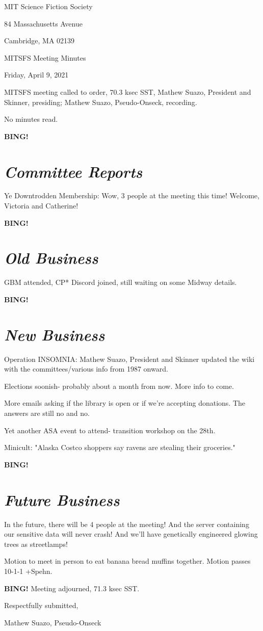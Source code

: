\documentclass[10pt]{article}
\newcommand{\bing}{{\bf BING!} }
\newcommand{\goto}[1]{\bing \vskip 12pt \section*{{\em{#1}}}}
\newcommand{\skinner}{Mathew Suazo, President and Skinner\xspace}
\newcommand{\onseck}{Mathew Suazo, Pseudo-Onseck\xspace}
\newcommand{\meetingdate}{Friday, April 9, 2021}
\begin{document}
\begin{center}

MIT Science Fiction Society

84 Massachusetts Avenue

Cambridge, MA 02139

\vspace{12pt}

MITSFS Meeting Minutes

\meetingdate

\end{center}

\vspace{18pt}

\setlength{\parskip}{6pt}

\noindent
MITSFS meeting called to order, 70.3 ksec SST,
\skinner, presiding; \onseck, recording.

No minutes read.

\goto{Committee Reports}

Ye Downtrodden Membership: Wow, 3 people at the meeting this time! Welcome, Victoria and Catherine!

\goto{Old Business}

GBM attended, CP* Discord joined, still waiting on some Midway details.

\goto{New Business}

Operation INSOMNIA: \skinner updated the wiki with the committees/various info from 1987 onward.

Elections soonish- probably about a month from now. More info to come.

More emails asking if the library is open or if we're accepting donations. The answers are still no and no.

Yet another ASA event to attend- transition workshop on the 28th.

Minicult: "Alaska Costco shoppers say ravens are stealing their groceries."

\goto{Future Business}

In the future, there will be 4 people at the meeting! And the server containing our sensitive data will never crash! And we'll have genetically engineered glowing trees as streetlamps!

Motion to meet in person to eat banana bread muffins together. Motion passes 10-1-1 +Spehn.

\bing
\noindent
Meeting adjourned, 71.3 ksec SST.

\vspace{18pt}

\centerline{Respectfully submitted,}
\centerline{\onseck}
\end{document}
